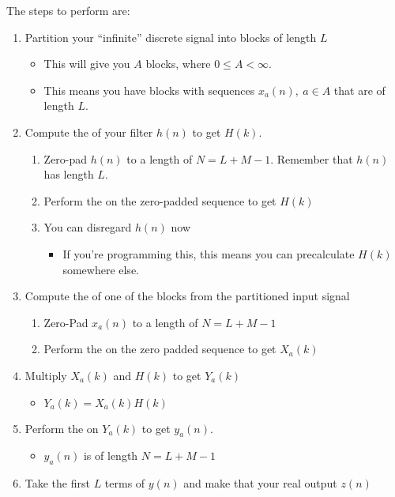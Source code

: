 The steps to perform  are:
\begin{enumerate}[noitemsep]
\item Partition your ``infinite'' discrete signal into blocks of length $L$
  \begin{itemize}[noitemsep]
  \item This will give you $A$ blocks, where $0 \leq A < \infty$.
  \item This means you have blocks with sequences $x_{a}(n), \: a \in A$ that are of length $L$.
  \end{itemize}
\item Compute the  of your filter $h(n)$ to get $H(k)$.
  \begin{enumerate}[noitemsep]
  \item Zero-pad $h(n)$ to a length of $N=L+M-1$. Remember that $h(n)$ has length $L$.
  \item Perform the  on the zero-padded sequence to get $H(k)$
  \item You can disregard $h(n)$ now
    \begin{itemize}[noitemsep]
    \item If you're programming this, this means you can precalculate $H(k)$ somewhere else.
    \end{itemize}
  \end{enumerate}
\item Compute the  of one of the blocks from the partitioned input signal
  \begin{enumerate}[noitemsep]
  \item Zero-Pad $x_{a}(n)$ to a length of $N=L+M-1$
  \item Perform the  on the zero padded sequence to get $X_{a}(k)$
  \end{enumerate}
\item Multiply $X_{a}(k)$ and $H(k)$ to get $Y_{a}(k)$
  \begin{itemize}[noitemsep]
  \item $Y_{a}(k) = X_{a}(k) H(k)$
  \end{itemize}
\item Perform the  on $Y_{a}(k)$ to get $y_{a}(n)$.
  \begin{itemize}[noitemsep]
  \item $y_{a}(n)$ is of length $N=L+M-1$
  \end{itemize}
\item Take the first $L$ terms of $y(n)$ and make that your real output $z(n)$

\end{enumerate}
